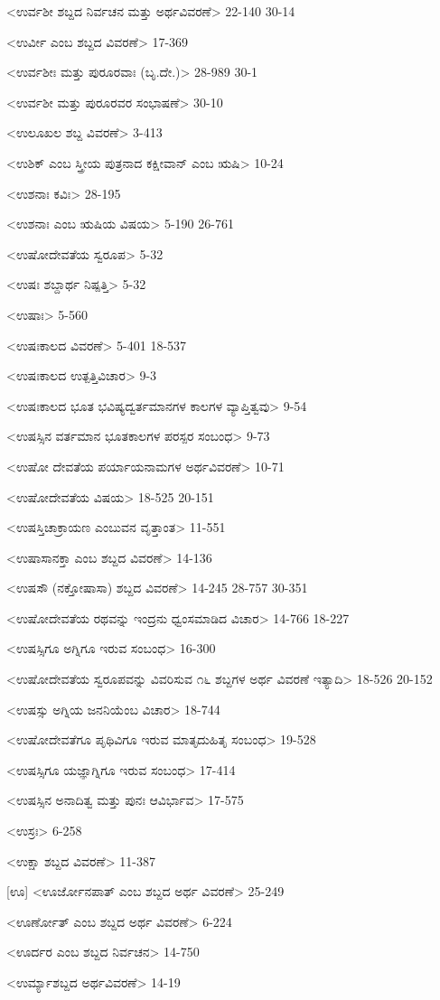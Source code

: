<ಉರ್ವಶೀ ಶಬ್ದದ ನಿರ್ವಚನ ಮತ್ತು ಅರ್ಥವಿವರಣೆ>
22-140 
30-14

<ಉರ್ವೀ ಎಂಬ ಶಬ್ದದ ವಿವರಣೆ>
17-369

<ಉರ್ವಶೀಃ ಮತ್ತು ಪುರೂರವಾಃ (ಬೃ.ದೇ.)>
28-989 
30-1

<ಉರ್ವಶೀ ಮತ್ತು ಪುರೂರವರ ಸಂಭಾಷಣೆ>
30-10

<ಉಲೂಖಲ ಶಬ್ದ ವಿವರಣೆ>
3-413

<ಉಶಿಕ್‍ ಎಂಬ ಸ್ತ್ರೀಯ ಪುತ್ರನಾದ ಕಕ್ಷೀವಾನ್‍ ಎಂಬ ಋಷಿ>
10-24

<ಉಶನಾಃ ಕವಿಃ>
28-195

<ಉಶನಾಃ ಎಂಬ ಋಷಿಯ ವಿಷಯ>
5-190 
26-761

<ಉಷೋದೇವತೆಯ ಸ್ವರೂಪ>
5-32

<ಉಷಃ ಶಬ್ದಾರ್ಥ ನಿಷ್ಪತ್ತಿ>
5-32

<ಉಷಾಃ>
5-560

<ಉಷಃಕಾಲದ ವಿವರಣೆ>
5-401
18-537

<ಉಷಃಕಾಲದ ಉತ್ಪತ್ತಿವಿಚಾರ>
9-3

<ಉಷಃಕಾಲದ ಭೂತ ಭವಿಷ್ಯದ್ವರ್ತಮಾನಗಳ ಕಾಲಗಳ ವ್ಯಾಪ್ತಿತ್ವವು>
9-54

<ಉಷಸ್ಸಿನ ವರ್ತಮಾನ ಭೂತಕಾಲಗಳ ಪರಸ್ಪರ ಸಂಬಂಧ>
9-73

<ಉಷೋ ದೇವತೆಯ ಪರ್ಯಾಯನಾಮಗಳ ಅರ್ಥವಿವರಣೆ>
10-71

<ಉಷೋದೇವತೆಯ ವಿಷಯ>
18-525
20-151

<ಉಷಸ್ತಿಚಾಕ್ರಾಯಣ ಎಂಬುವನ ವೃತ್ತಾಂತ>
11-551

<ಉಷಾಸಾನಕ್ತಾ ಎಂಬ ಶಬ್ದದ ವಿವರಣೆ>
14-136

<ಉಷಸೌ (ನಕ್ತೋಷಾಸಾ) ಶಬ್ದದ ವಿವರಣೆ>
14-245
28-757
30-351


<ಉಷೋದೇವತೆಯ ರಥವನ್ನು ಇಂದ್ರನು ಧ್ವಂಸಮಾಡಿದ ವಿಚಾರ>
14-766
18-227

<ಉಷಸ್ಸಿಗೂ ಅಗ್ನಿಗೂ ಇರುವ ಸಂಬಂಧ>
16-300

<ಉಷೋದೇವತೆಯ ಸ್ವರೂಪವನ್ನು ವಿವರಿಸುವ ೧೬ ಶಬ್ದಗಳ ಅರ್ಥ ವಿವರಣೆ ಇತ್ಯಾದಿ>
18-526
20-152

<ಉಷಸ್ಸು ಅಗ್ನಿಯ ಜನನಿಯೆಂಬ ವಿಚಾರ>
18-744

<ಉಷೋದೇವತೆಗೂ ಪೃಥಿವಿಗೂ ಇರುವ ಮಾತೃದುಹಿತೃ ಸಂಬಂಧ>
19-528

<ಉಷಸ್ಸಿಗೂ ಯಜ್ಞಾಗ್ನಿಗೂ ಇರುವ ಸಂಬಂಧ>
17-414

<ಉಷಸ್ಸಿನ ಅನಾದಿತ್ವ ಮತ್ತು ಪುನಃ ಆವಿರ್ಭಾವ>
17-575

<ಉಸ್ರಃ>
6-258

<ಉಕ್ಷಾ ಶಬ್ದದ ವಿವರಣೆ>
11-387

[ಊ]
<ಊರ್ಜೋನಪಾತ್‍ ಎಂಬ ಶಬ್ದದ ಅರ್ಥ ವಿವರಣೆ>
25-249

<ಊರ್ಣೋತ್‍ ಎಂಬ ಶಬ್ದದ ಅರ್ಥ ವಿವರಣೆ>
6-224

<ಊರ್ದರ ಎಂಬ ಶಬ್ದದ ನಿರ್ವಚನ>
14-750

<ಉರ್ಮ್ಯಾಶಬ್ದದ ಅರ್ಥವಿವರಣೆ>
14-19


